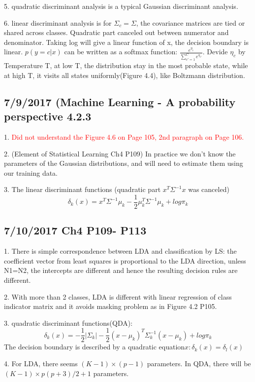 \documentclass[a4paper, 12pt]{article}
\begin{document}
5. quadratic discriminant analysis is a typical Gaussian discriminant analysis.

6. linear discriminant analysis is for $\Sigma_c=\Sigma$, the covariance matrices are tied or shared across classes. Quadratic part canceled out between numerator and denominator. Taking log will give a linear function of x, the decision boundary is linear. $p(y=c|x)$ can be written as a softmax function: $\frac{e^{\eta_c}}{\sum_{c'=1}^{C}e^{\eta_{c'}}}$. Devide $\eta_c$ by Temperature T, at low T, the distribution stay in the most probable state, while at high T, it visits all states uniformly(Figure 4.4), like Boltzmann distribution.
	
\subsection*{7/9/2017 (Machine Learning - A probability perspective 4.2.3}

1. \textcolor{red}{Did not understand the Figure 4.6 on Page 105, 2nd paragraph on Page 106.}

2. (Element of Statistical Learning Ch4 P109) In practice we don't know the parameters of the Gaussian distributions, and will need to estimate them using our training data.

3. The linear discriminant functions (quadratic part $x^T\Sigma^{-1}x$ was canceled)
$$\delta_k(x)=x^T\Sigma^{-1}\mu_k-\frac{1}{2}\mu^T_k\Sigma^{-1}\mu_k + log\pi_k$$
	
\subsection*{7/10/2017 Ch4 P109- P113 }

1. There is simple correspondence between LDA and classification by LS: the coefficient vector from least squares is proportional to the LDA direction, unless N1=N2, the intercepts are different and hence the resulting decision rules are different.

2. With more than 2 classes, LDA is different with linear regression of class indicator matrix and it avoids masking problem as in Figure 4.2 P105.

3. quadratic discriminant functions(QDA): 
$$\delta_k(x)=-\frac{1}{2}|\Sigma_k| - \frac{1}{2}(x-\mu_k)^T\Sigma^{-1}_k(x-\mu_k) +log\pi_k$$
The decision boundary is described by a quadratic equation${x:\delta_k(x)=\delta_l(x)}$

4. For LDA, there seems $(K-1)\times(p-1)$ parameters. In QDA, there will be $(K-1)\times{p(p+3)/2+1}$ parameters.
\end{document}

